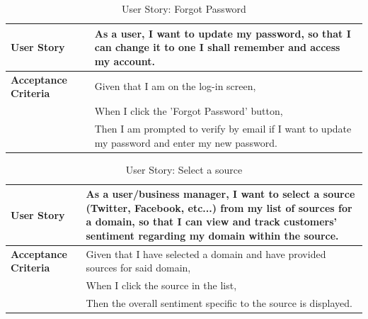 \documentclass[12pt]{article}
\begin{document}
\begin{table}[htbp]
  \caption{User Story: Forgot Password}
  \begin{tabular}{|p{}|p{}|}
    \hline
    \textbf{User Story}          & As a user, I want to update my password, so that I can change it to one I shall remember and access my account. \\
    \hline
    \textbf{Acceptance Criteria} &
    Given that I am on the log-in screen,                                                                                                          \\
                                 & When I click the 'Forgot Password' button,                                                                      \\
                                 & Then I am prompted to verify by email if I want to update my password and enter my new password.                \\
    \hline
  \end{tabular}
\end{table}

\begin{table}[htbp]
  \caption{User Story: Select a source}
  \begin{tabular}{|p{}|p{}|}
    \hline
    \textbf{User Story}          & As a user/business manager, I want to select a source (Twitter, Facebook, etc...) from my list of sources for a domain, so that I can view and track customers' sentiment regarding my domain within the source. \\
    \hline
    \textbf{Acceptance Criteria} &
    Given that I have selected a domain and have provided sources for said domain,                                                                                                                                                                  \\
                                 & When I click the source in the list,                                                                                                                                                                             \\
                                 & Then the overall sentiment specific to the source is displayed.                                                                                                                                                  \\
    \hline
  \end{tabular}
\end{table}
\end{document}
